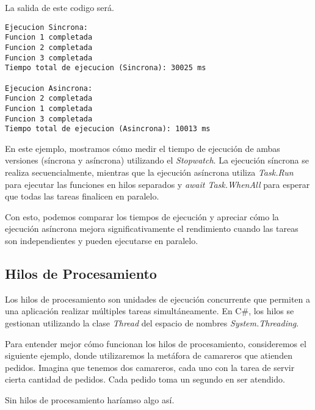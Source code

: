 \documentclass[executivepaper]{article}
\begin{document}
La salida de este codigo será.

\begin{verbatim}
Ejecucion Sincrona:
Funcion 1 completada
Funcion 2 completada
Funcion 3 completada
Tiempo total de ejecucion (Sincrona): 30025 ms

Ejecucion Asincrona:
Funcion 2 completada
Funcion 1 completada
Funcion 3 completada
Tiempo total de ejecucion (Asincrona): 10013 ms
\end{verbatim}

En este ejemplo, mostramos cómo medir el tiempo de ejecución de ambas versiones (síncrona y asíncrona) utilizando el \emph{Stopwatch}. La ejecución síncrona se realiza secuencialmente, mientras que la ejecución asíncrona utiliza \emph{Task.Run} para ejecutar las funciones en hilos separados y \emph{await Task.WhenAll} para esperar que todas las tareas finalicen en paralelo.

Con esto, podemos comparar los tiempos de ejecución y apreciar cómo la ejecución asíncrona mejora significativamente el rendimiento cuando las tareas son independientes y pueden ejecutarse en paralelo.

\subsection{Hilos de Procesamiento}

Los hilos de procesamiento son unidades de ejecución concurrente que permiten a una aplicación realizar múltiples tareas simultáneamente. En C\#, los hilos se gestionan utilizando la clase \emph{Thread} del espacio de nombres \emph{System.Threading}.

Para entender mejor cómo funcionan los hilos de procesamiento, consideremos el siguiente ejemplo, donde utilizaremos la metáfora de camareros que atienden pedidos. Imagina que tenemos dos camareros, cada uno con la tarea de servir cierta cantidad de pedidos. Cada pedido toma un segundo en ser atendido.

Sin hilos de procesamiento haríamso algo así.
\end{document}
